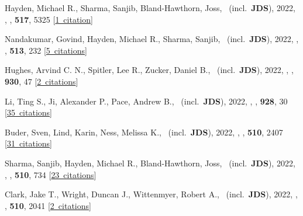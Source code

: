 \item[{\color{numcolor}\scriptsize74}] Hayden, Michael R., Sharma, Sanjib, Bland-Hawthorn, Joss, \etal\ (incl.\ \textbf{JDS}), 2022, , \mnras, \textbf{517}, 5325 [\href{https://ui.adsabs.harvard.edu/#abs/2022MNRAS.517.5325H}{1~citation}]

\item[{\color{numcolor}\scriptsize73}] Nandakumar, Govind, Hayden, Michael R., Sharma, Sanjib, \etal\ (incl.\ \textbf{JDS}), 2022, , \mnras, \textbf{513}, 232 [\href{https://ui.adsabs.harvard.edu/#abs/2022MNRAS.513..232N}{5~citations}]

\item[{\color{numcolor}\scriptsize72}] Hughes, Arvind C. N., Spitler, Lee R., Zucker, Daniel B., \etal\ (incl.\ \textbf{JDS}), 2022, , \apj, \textbf{930}, 47 [\href{https://ui.adsabs.harvard.edu/#abs/2022ApJ...930...47H}{2~citations}]

\item[{\color{numcolor}\scriptsize71}] Li, Ting S., Ji, Alexander P., Pace, Andrew B., \etal\ (incl.\ \textbf{JDS}), 2022, , \apj, \textbf{928}, 30 [\href{https://ui.adsabs.harvard.edu/#abs/2022ApJ...928...30L}{35~citations}]

\item[{\color{numcolor}\scriptsize70}] Buder, Sven, Lind, Karin, Ness, Melissa K., \etal\ (incl.\ \textbf{JDS}), 2022, , \mnras, \textbf{510}, 2407 [\href{https://ui.adsabs.harvard.edu/#abs/2022MNRAS.510.2407B}{31~citations}]

\item[{\color{numcolor}\scriptsize69}] Sharma, Sanjib, Hayden, Michael R., Bland-Hawthorn, Joss, \etal\ (incl.\ \textbf{JDS}), 2022, , \mnras, \textbf{510}, 734 [\href{https://ui.adsabs.harvard.edu/#abs/2022MNRAS.510..734S}{23~citations}]

\item[{\color{numcolor}\scriptsize68}] Clark, Jake T., Wright, Duncan J., Wittenmyer, Robert A., \etal\ (incl.\ \textbf{JDS}), 2022, , \mnras, \textbf{510}, 2041 [\href{https://ui.adsabs.harvard.edu/#abs/2022MNRAS.510.2041C}{2~citations}]

